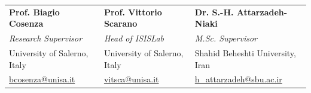 \documentclass[10pt, a4paper]{article}
\begin{document}
\begin{tabularx}{\linewidth}{@{} X X X @{}}
  \textbf{Prof. Biagio Cosenza} &
  \textbf{Prof. Vittorio Scarano} &
  \textbf{Dr. S.-H. Attarzadeh-Niaki} \\[2pt]
  \textit{Research Supervisor} &
  \textit{Head of ISISLab} &
  \textit{M.Sc. Supervisor} \\[2pt]
  University of Salerno, Italy &
  University of Salerno, Italy &
  Shahid Beheshti University, Iran \\[2pt]
  \href{mailto:bcosenza@unisa.it}{bcosenza@unisa.it} &
  \href{mailto:vitsca@unisa.it}{vitsca@unisa.it} &
  \href{mailto:h_attarzadeh@sbu.ac.ir}{h\_attarzadeh@sbu.ac.ir} \\
\end{tabularx}
\end{document}
